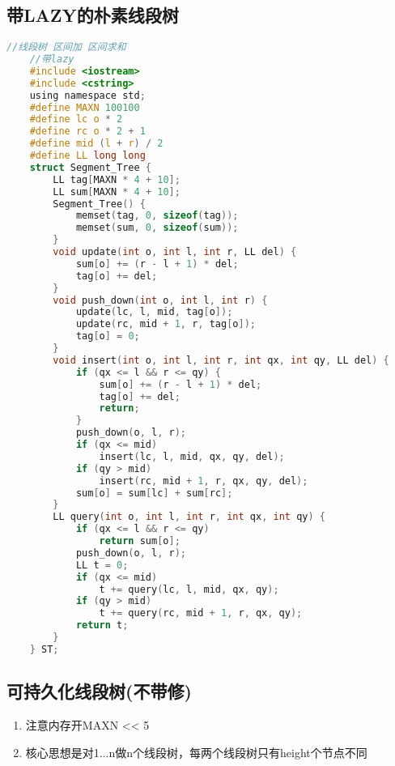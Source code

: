 \documentclass[]{article}
\begin{document}
\subsection{带LAZY的朴素线段树}

\begin{lstlisting}[language={c}]
    //线段树 区间加 区间求和
    //带lazy
    #include <iostream>
    #include <cstring>
    using namespace std;
    #define MAXN 100100
    #define lc o * 2
    #define rc o * 2 + 1
    #define mid (l + r) / 2
    #define LL long long
    struct Segment_Tree {
        LL tag[MAXN * 4 + 10];
        LL sum[MAXN * 4 + 10];
        Segment_Tree() {
            memset(tag, 0, sizeof(tag));
            memset(sum, 0, sizeof(sum));
        }
        void update(int o, int l, int r, LL del) {
            sum[o] += (r - l + 1) * del;
            tag[o] += del;
        }
        void push_down(int o, int l, int r) {
            update(lc, l, mid, tag[o]);
            update(rc, mid + 1, r, tag[o]);
            tag[o] = 0;
        }
        void insert(int o, int l, int r, int qx, int qy, LL del) {
            if (qx <= l && r <= qy) {
                sum[o] += (r - l + 1) * del;
                tag[o] += del;
                return;
            }
            push_down(o, l, r);
            if (qx <= mid)
                insert(lc, l, mid, qx, qy, del);
            if (qy > mid)
                insert(rc, mid + 1, r, qx, qy, del);
            sum[o] = sum[lc] + sum[rc];
        }
        LL query(int o, int l, int r, int qx, int qy) {
            if (qx <= l && r <= qy)
                return sum[o];
            push_down(o, l, r);
            LL t = 0;
            if (qx <= mid)
                t += query(lc, l, mid, qx, qy);
            if (qy > mid)
                t += query(rc, mid + 1, r, qx, qy);
            return t;
        }
    } ST;
\end{lstlisting}



\subsection{可持久化线段树(不带修)}

\begin{enumerate}
    \item 注意内存开MAXN << 5
    \item 核心思想是对1...n做n个线段树，每两个线段树只有height个节点不同
\end{enumerate}
\end{document}
